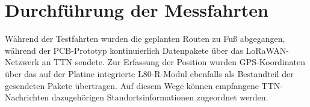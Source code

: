 \section{Durchführung der Messfahrten}

Während der Testfahrten wurden die geplanten Routen zu Fuß abgegangen, während der PCB-Prototyp kontinuierlich Datenpakete 
über das LoRaWAN-Netzwerk an TTN sendete. Zur Erfassung der Position wurden GPS-Koordinaten über das auf der Platine 
integrierte L80-R-Modul ebenfalls als Bestandteil der gesendeten Pakete übertragen. 
Auf diesem Wege können empfangene TTN-Nachrichten dazugehörigen Standortsinformationen zugeordnet werden.

